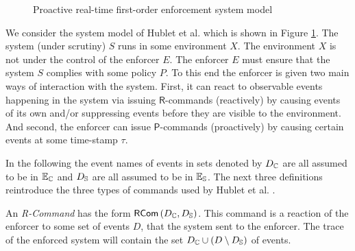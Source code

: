 \begin{figure}
    \begin{center}
    \end{center}
    \vspace{-1.5em}
    \caption{Proactive real-time first-order enforcement system model \cite[Figure 2]{whyenf}}
    \label{fig:system-model}
\end{figure}

We consider the system model of Hublet et al. \cite{whyenf} which is shown
in Figure \ref{fig:system-model}.
The system (under scrutiny) $S$ runs in some environment $X$.
The environment $X$ is not under the control of the enforcer $E$.
The enforcer $E$ must ensure that the system $S$ complies with some
policy $P$. To this end the enforcer is given two main ways of interaction
with the system. First, it can react to observable events happening in the system
via issuing $\mathsf{R}$-commands (reactively) by causing events of its own
and/or suppressing events before they are visible to the environment.
And second, the enforcer can issue $\mathsf{P}$-commands (proactively)
by causing certain events at some time-stamp $\tau$.


In the following the event names of events in sets denoted by
$D_{\mathbb{C}}$ are all assumed to be in $\mathbb{E}_{\mathbb{C}}$ and
$D_{\mathbb{S}}$ are all assumed to be in $\mathbb{E}_{\mathbb{S}}$.
The next three definitions reintroduce the three types of commands
used by Hublet et al. \cite{whyenf}.
\begin{definition}
    \label{def:enf-r-cmd}
    An \emph{R-Command} has the form
    $\mathsf{RCom}\left(D_{\mathbb{C}}, D_{\mathbb{S}}\right)$.
    This command is a reaction of the enforcer to some set of events $D$,
    that the system sent to the enforcer.
    The trace of the enforced system will contain the set
    $D_{\mathbb{C}} \cup \left(D \setminus D_{\mathbb{S}} \right)$ of events.
\end{definition}

